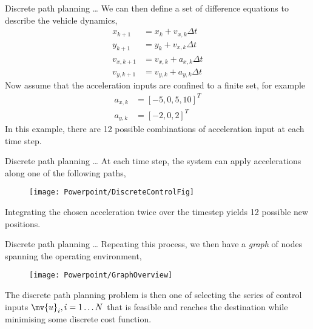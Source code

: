 \begin{frame}{Discrete path planning \ldots}
	We can then define a set of {\color{red} difference equations} to describe the vehicle dynamics,
	\vspace{-10pt}
	\begin{align*}
	x_{k+1} &= x_k + v_{x,k}\Delta t\\
	y_{k+1} &= y_k + v_{x,k}\Delta t\\
	v_{x,k+1} &= v_{x,k} + a_{x,k}\Delta t\\
	v_{y,k+1} &= v_{y,k} + a_{y,k}\Delta t
	\end{align*}
	Now assume that the acceleration inputs are confined to a finite set, for example 
	\vspace{-10pt}
	\begin{align*}
	a_{x,k} &= [-5,0,5,10]^T\\
	a_{y,k} &= [-2,0,2]^T
	\end{align*}
	In this example, there are 12 possible combinations of acceleration input at each time step.
\end{frame}

\begin{frame}{Discrete path planning \ldots}
	At each time step, the system can apply accelerations along one of the following paths,
	\begin{figure}
	\centering
	\texttt{[image: Powerpoint/DiscreteControlFig]}
	\label{fig:DiscreteControlFig}
	\end{figure}
	Integrating the chosen acceleration twice over the timestep yields 12 possible new positions. 
\end{frame}

\begin{frame}{Discrete path planning \ldots}
	Repeating this process, we then have a {\color{red}\textit{graph}} of nodes spanning the operating environment,
	\begin{figure}
	\centering
	\texttt{[image: Powerpoint/GraphOverview]}
	\label{fig:GraphOverview}
	\end{figure}
	The discrete path planning problem is then one of selecting the series of control inputs $\mv{u}_i, i=1\ldots N$ that is feasible and reaches the destination while minimising some discrete cost function.
\end{frame}